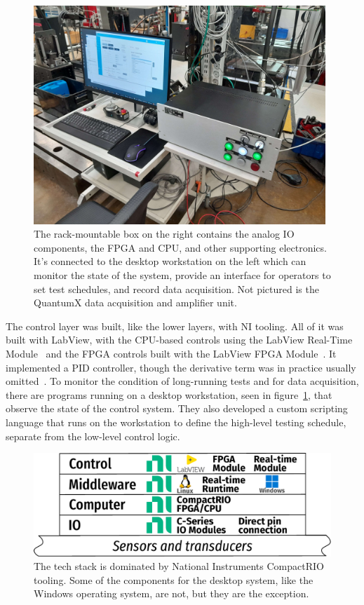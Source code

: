 \documentclass[english,12pt,a4paper,pdftex,eng,utf8]{aaltothesis}
\begin{document}
\begin{figure}[h]
  \centering
  \includegraphics[width=0.98\textwidth]{assets/solid_mechanics_control_monitor}
  \caption{The rack-mountable box on the right contains the analog IO components, the FPGA and CPU, and other supporting electronics.  It's connected to the desktop workstation on the left which can monitor the state of the system, provide an interface for operators to set test schedules, and record data acquisition.  Not pictured is the QuantumX data acquisition and amplifier unit.}\label{fig:solid_mechanics_control_monitor}
\end{figure}

The control layer was built, like the lower layers, with NI tooling.  All of it was built with LabView, with the CPU-based controls using the LabView Real-Time Module~\cite{NIRealTimeModule} and the FPGA controls built with the LabView FPGA Module~\cite{NIFPGAModule}.  It implemented a PID controller, though the derivative term was in practice usually omitted~\cite{Schad2011,Ali2010}.  To monitor the condition of long-running tests and for data acquisition, there are programs running on a desktop workstation, seen in figure~\ref{fig:solid_mechanics_control_monitor}, that observe the state of the control system.  They also developed a custom scripting language that runs on the workstation to define the high-level testing schedule, separate from the low-level control logic.

\begin{figure}[h]
  \centering
  \includegraphics[width=\textwidth]{assets/mechatronic_tech_stack_solid_mechanics}
  \caption{The tech stack is dominated by National Instruments CompactRIO tooling.  Some of the components for the desktop system, like the Windows operating system, are not, but they are the exception.}\label{fig:mechatronic_tech_stack_solid_mechanics}
\end{figure}
\end{document}
